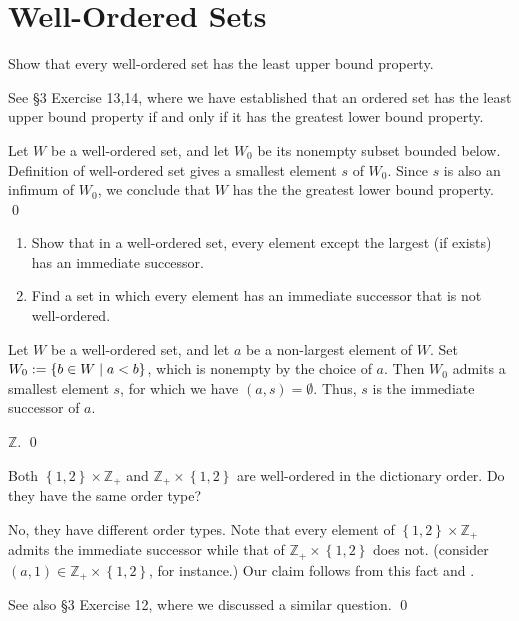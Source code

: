 \documentclass[a4paper,12pt]{article}
\begin{document}
\section{Well-Ordered Sets}
\setcounter{exe}{0}

\begin{exe}
	Show that every well-ordered set has the least upper bound property.
\end{exe}
\begin{sol}
	See \S3 Exercise 13,14, where we have established that
	an ordered set has the least upper bound property if and only if
	it has the greatest lower bound property.
	
	Let \( W \) be a well-ordered set,
	and let \( W_0 \) be its nonempty subset bounded below.
	Definition of well-ordered set gives a smallest element \( s \) of \( W_0 \).
	Since \( s \) is also an infimum of \( W_0 \),
	we conclude that \( W \) has the the greatest lower bound property.
	\qed\end{sol}

\begin{exe}\leavevmode
	\begin{enumerate}
		\item Show that in a well-ordered set,
		      every element except the largest (if exists) has an immediate successor.
		\item Find a set in which every element has an immediate successor that is not well-ordered.
	\end{enumerate}
\end{exe}
\begin{sol}\leavevmode \par
	Let \( W \) be a well-ordered set,
	and let \( a \) be a non-largest element of \( W \).
	Set
	\( W_0:=\left\{ b\in W \;|\; a<b \right\} \),
	which is nonempty by the choice of \( a \).
	Then \( W_0 \) admits a smallest element \( s \),
	for which we have
	\( (a,s)= \emptyset \).
	Thus, \( s \) is the immediate successor of \( a \).
	
	\( \mathbb{Z} \).
	\qed\end{sol}

\begin{exe}
	Both \( \left\{ 1,2 \right\} \times \mathbb{Z}_{+} \)
	and
	\( \mathbb{Z}_{+}\times \left\{ 1,2 \right\} \)
	are well-ordered in the dictionary order.
	Do they have the same order type?
\end{exe}
\begin{sol}
	No, they have different order types.
	Note that every element of
	\( \left\{ 1,2 \right\} \times \mathbb{Z}_{+} \)
	admits the immediate successor
	while that of 
	\( \mathbb{Z}_{+} \times \left\{ 1,2 \right\} \)
	does not.
	(consider \( (a,1)\in \mathbb{Z}_{+} \times \left\{ 1,2 \right\} \),
	for instance.)
	Our claim follows from this fact and .
	
	See also \S3 Exercise 12, where we discussed a similar question. 
	\qed\end{sol}
\end{document}
